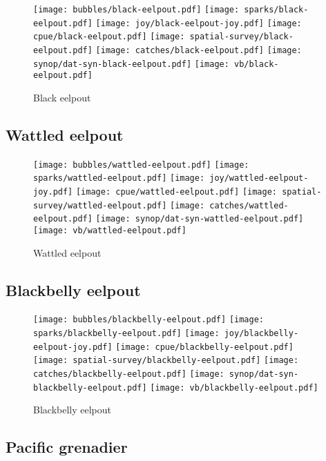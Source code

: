 \begin{figure}[htbp]
\centering
\texttt{[image: bubbles/black-eelpout.pdf]}
\texttt{[image: sparks/black-eelpout.pdf]}
\texttt{[image: joy/black-eelpout-joy.pdf]}
\texttt{[image: cpue/black-eelpout.pdf]}
\texttt{[image: spatial-survey/black-eelpout.pdf]}
\texttt{[image: catches/black-eelpout.pdf]}
\texttt{[image: synop/dat-syn-black-eelpout.pdf]}
\texttt{[image: vb/black-eelpout.pdf]}
\caption{Black eelpout}
\end{figure}
\clearpage
\subsection*{Wattled eelpout}

\begin{figure}[htbp]
\centering
\texttt{[image: bubbles/wattled-eelpout.pdf]}
\texttt{[image: sparks/wattled-eelpout.pdf]}
\texttt{[image: joy/wattled-eelpout-joy.pdf]}
\texttt{[image: cpue/wattled-eelpout.pdf]}
\texttt{[image: spatial-survey/wattled-eelpout.pdf]}
\texttt{[image: catches/wattled-eelpout.pdf]}
\texttt{[image: synop/dat-syn-wattled-eelpout.pdf]}
\texttt{[image: vb/wattled-eelpout.pdf]}
\caption{Wattled eelpout}
\end{figure}
\clearpage
\subsection*{Blackbelly eelpout}

\begin{figure}[htbp]
\centering
\texttt{[image: bubbles/blackbelly-eelpout.pdf]}
\texttt{[image: sparks/blackbelly-eelpout.pdf]}
\texttt{[image: joy/blackbelly-eelpout-joy.pdf]}
\texttt{[image: cpue/blackbelly-eelpout.pdf]}
\texttt{[image: spatial-survey/blackbelly-eelpout.pdf]}
\texttt{[image: catches/blackbelly-eelpout.pdf]}
\texttt{[image: synop/dat-syn-blackbelly-eelpout.pdf]}
\texttt{[image: vb/blackbelly-eelpout.pdf]}
\caption{Blackbelly eelpout}
\end{figure}
\clearpage
\subsection*{Pacific grenadier}

